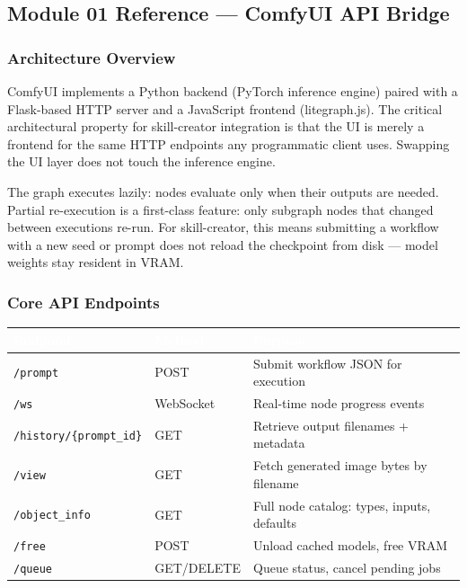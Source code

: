 \documentclass[11pt,letterpaper]{article}
\newcommand{\tableheader}[1]{\textbf{\sffamily\textcolor{white}{#1}}}
\begin{document}
\subsection{Module 01 Reference --- ComfyUI API Bridge}

\subsubsection{Architecture Overview}

ComfyUI implements a Python backend (PyTorch inference engine) paired with a Flask-based
HTTP server and a JavaScript frontend (litegraph.js). The critical architectural property
for skill-creator integration is that the UI is merely a frontend for the same HTTP
endpoints any programmatic client uses. Swapping the UI layer does not touch the inference
engine.

The graph executes lazily: nodes evaluate only when their outputs are needed. Partial
re-execution is a first-class feature: only subgraph nodes that changed between
executions re-run. For skill-creator, this means submitting a workflow with a new seed
or prompt does not reload the checkpoint from disk --- model weights stay resident in VRAM.

\subsubsection{Core API Endpoints}

\begin{center}
\begin{tabularx}{\textwidth}{L{4cm}L{2.5cm}X}
\toprule
{}
\tableheader{Endpoint} & \tableheader{Method} & \tableheader{Purpose} \\
\midrule
\texttt{/prompt} & POST & Submit workflow JSON for execution \\
\texttt{/ws} & WebSocket & Real-time node progress events \\
\texttt{/history/\{prompt\_id\}} & GET & Retrieve output filenames + metadata \\
\texttt{/view} & GET & Fetch generated image bytes by filename \\
\texttt{/object\_info} & GET & Full node catalog: types, inputs, defaults \\
\texttt{/free} & POST & Unload cached models, free VRAM \\
\texttt{/queue} & GET/DELETE & Queue status, cancel pending jobs \\
\bottomrule
\end{tabularx}
\end{center}
\end{document}
